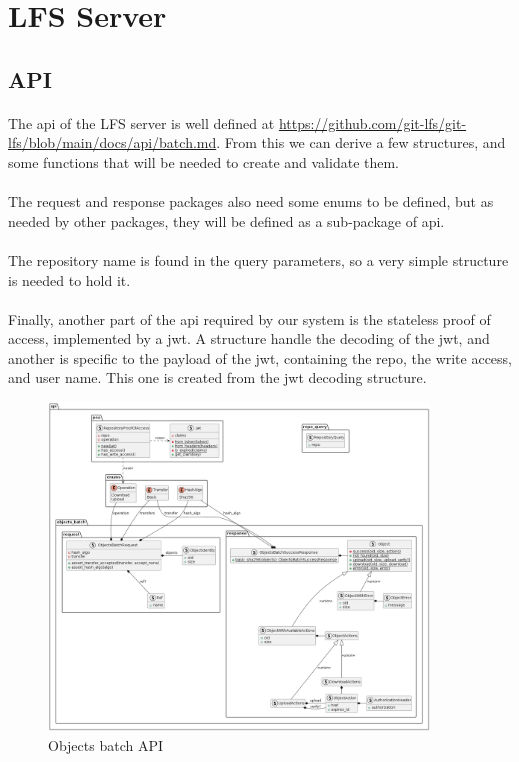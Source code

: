 \section{LFS Server}

\subsection{API}

\paragraph{}
The api of the LFS server is well defined at \url{https://github.com/git-lfs/git-lfs/blob/main/docs/api/batch.md}. From this we can derive a few structures, and some functions that will be needed to create and validate them. 

\paragraph{}
The request and response packages also need some enums to be defined, but as needed by other packages, they will be defined as a sub-package of api. 

\paragraph{}
The repository name is found in the query parameters, so a very simple structure is needed to hold it.

\paragraph{}
Finally, another part of the api required by our system is the stateless proof of access, implemented by a jwt. A structure handle the decoding of the jwt, and another is specific to the payload of the jwt, containing the repo, the write access, and user name. This one is created from the jwt decoding structure.

\begin{figure}[H]
    \centering
    \includegraphics[width=0.9\textwidth]{iteration_03/diagrams/batch_api_structure.png}
    \caption{Objects batch  API}
    \label{fig:lfs_server_api}
\end{figure}

